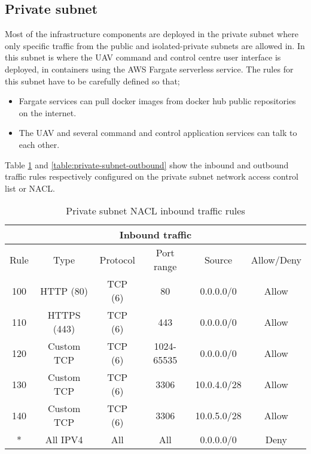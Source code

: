 \subsection{Private subnet}
\label{private-subnet}

Most of the infrastructure components are deployed in the private subnet where only specific traffic from the public and isolated-private subnets are allowed in. In this subnet is where the UAV command and control centre user interface is deployed, in containers using the AWS Fargate serverless service. The rules for this subnet have to be carefully defined so that;

\begin{itemize}
    \item Fargate services can pull docker images from docker hub public repositories on the internet.
    \item The UAV and several command and control application services can talk to each other.
\end{itemize}

Table \ref{table:private-subnet-inbound} and \ref{table:private-subnet-outbound} show the inbound and outbound traffic rules respectively configured on the private subnet network access control list or NACL.

\begin{table}[H]
    \centering
    \begin{tabular}{|c|c|c|c|c|c|}
        \hline
        \multicolumn{6}{|c|}{Inbound traffic}                                 \\
        \hline
        Rule & Type        & Protocol & Port range & Source      & Allow/Deny \\
        \hline
        100  & HTTP (80)   & TCP (6)  & 80         & 0.0.0.0/0   & Allow      \\
        \hline
        110  & HTTPS (443) & TCP (6)  & 443        & 0.0.0.0/0   & Allow      \\
        \hline
        120  & Custom TCP  & TCP (6)  & 1024-65535 & 0.0.0.0/0   & Allow      \\
        \hline
        130  & Custom TCP  & TCP (6)  & 3306       & 10.0.4.0/28 & Allow      \\
        \hline
        140  & Custom TCP  & TCP (6)  & 3306       & 10.0.5.0/28 & Allow      \\
        \hline
        *    & All IPV4    & All      & All        & 0.0.0.0/0   & Deny       \\
        \hline
    \end{tabular}
    \caption{Private subnet NACL inbound traffic rules}
    \label{table:private-subnet-inbound}
\end{table}


